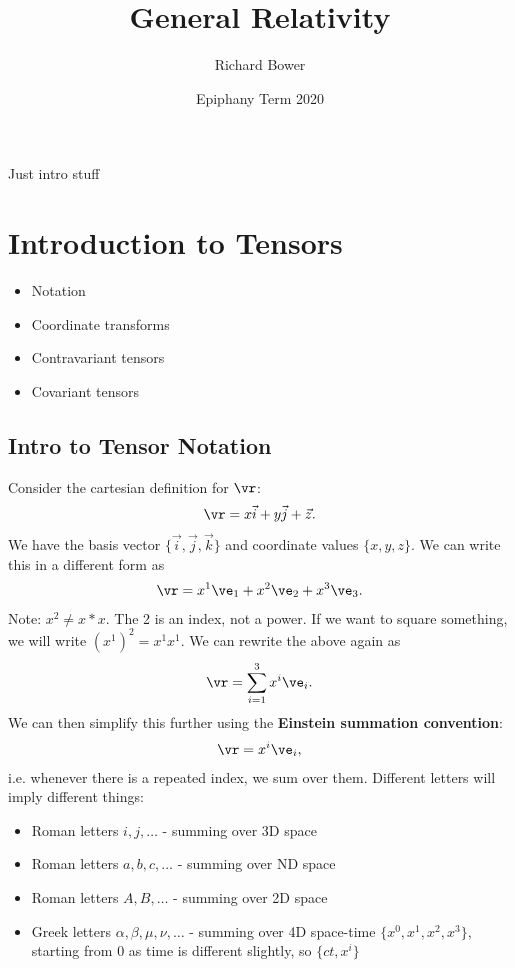 \documentclass[a4paper, 11pt, normalem]{report}
\title{General Relativity \vspace{-20pt}}
\author{Richard Bower}
\date{\vspace{-15pt}Epiphany Term 2020}
\begin{document}
\maketitle
\tableofcontents
\chapter{}
Just intro stuff

\chapter{Introduction to Tensors}
\begin{itemize}
    \item Notation
    \item Coordinate transforms
    \item Contravariant tensors
    \item Covariant tensors
\end{itemize}

\section{Intro to Tensor Notation}
Consider the cartesian definition for $\vr$:
\begin{align}
    \vr = x\vec{i} + y\vec{j} + \vec{z}.
\end{align}
We have the basis vector $\{\vec{i},\vec{j},\vec{k}\}$ and coordinate values $\{x,y,z\}$.
We can write this in a different form as
\begin{align}
    \vr = x^1\ve_1 + x^2\ve_2 + x^3\ve_3.
\end{align}
Note: $x^2 \neq x*x$.
The 2 is an index, not a power. 
If we want to square something, we will write $(x^1)^2 = x^1x^1$.
We can rewrite the above again as
\begin{align}
    \vr = \sum_{i=1}^3 x^i\ve_i.
\end{align}
We can then simplify this further using the \textbf{Einstein summation convention}:
\begin{align}
    \vr = x^i\ve_i,
\end{align}
i.e. whenever there is a repeated index, we sum over them. 
Different letters will imply different things:
\begin{itemize}
    \item Roman letters $i,j,\dots$ - summing over 3D space
    \item Roman letters $a,b,c,\dots$ - summing over ND space
    \item Roman letters $A,B,\dots$ - summing over 2D space
    \item Greek letters $\alpha,\beta,\mu,\nu,\dots$ - summing over 4D space-time $\{x^0,x^1,x^2,x^3\}$, starting from 0 as time is different slightly, so $\{ct,x^i\}$
\end{itemize}
\end{document}
